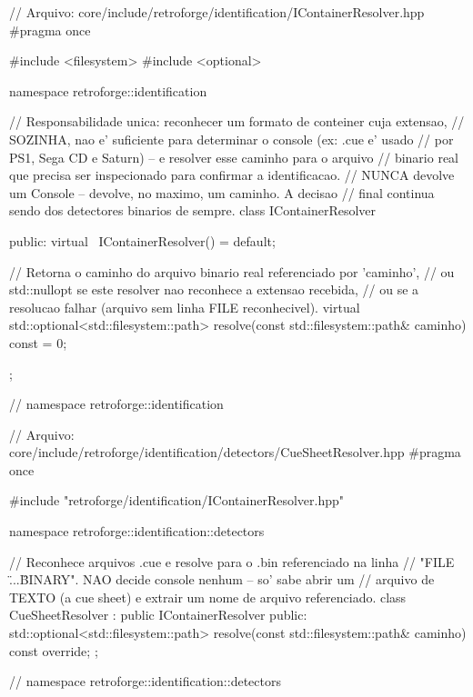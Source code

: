 \begin{CaixaCodigo}
// Arquivo: core/include/retroforge/identification/IContainerResolver.hpp
#pragma once

#include <filesystem>
#include <optional>

namespace retroforge::identification {

// Responsabilidade unica: reconhecer um formato de conteiner cuja extensao,
// SOZINHA, nao e' suficiente para determinar o console (ex: .cue e' usado
// por PS1, Sega CD e Saturn) -- e resolver esse caminho para o arquivo
// binario real que precisa ser inspecionado para confirmar a identificacao.
// NUNCA devolve um Console -- devolve, no maximo, um caminho. A decisao
// final continua sendo dos detectores binarios de sempre.
class IContainerResolver {
public:
    virtual ~IContainerResolver() = default;

    // Retorna o caminho do arquivo binario real referenciado por 'caminho',
    // ou std::nullopt se este resolver nao reconhece a extensao recebida,
    // ou se a resolucao falhar (arquivo sem linha FILE reconhecivel).
    virtual std::optional<std::filesystem::path>
    resolve(const std::filesystem::path& caminho) const = 0;
};

} // namespace retroforge::identification
\end{CaixaCodigo}

\begin{CaixaCodigo}
// Arquivo: core/include/retroforge/identification/detectors/CueSheetResolver.hpp
#pragma once

#include "retroforge/identification/IContainerResolver.hpp"

namespace retroforge::identification::detectors {

// Reconhece arquivos .cue e resolve para o .bin referenciado na linha
// "FILE \"...\" BINARY". NAO decide console nenhum -- so' sabe abrir um
// arquivo de TEXTO (a cue sheet) e extrair um nome de arquivo referenciado.
class CueSheetResolver : public IContainerResolver {
public:
    std::optional<std::filesystem::path>
    resolve(const std::filesystem::path& caminho) const override;
};

} // namespace retroforge::identification::detectors
\end{CaixaCodigo}

